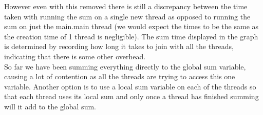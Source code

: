 \documentclass[a4paper, 12pt]{article}
\begin{document}
		However even with this removed there is still a discrepancy between the time taken with running the sum on a single new thread as opposed to running the sum on just the main.main thread (we would expect the times to be the same as the creation time of 1 thread is negligible). The sum time displayed in the graph is determined by recording how long it takes to join with all the threads, indicating that there is some other overhead.\\
		
		So far we have been summing everything directly to the global sum variable, causing a lot of contention as all the threads are trying to access this one variable. Another option is to use a local sum variable on each of the threads so that each thread uses its local sum and only once a thread has finished summing will it add to the global sum.\\
		
		\newpage
					
\end{document}
